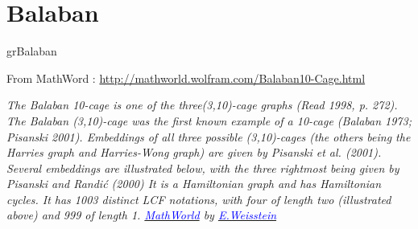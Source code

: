 \newpage\section{Balaban}\label{balaban}

\begin{NewMacroBox}{grBalaban}{}

\medskip
From MathWord : \url{http://mathworld.wolfram.com/Balaban10-Cage.html} 

\emph{The Balaban 10-cage is one of the three(3,10)-cage graphs (Read 1998, p. 272). The Balaban (3,10)-cage was the first known example of a 10-cage (Balaban 1973; Pisanski 2001). Embeddings of all three possible (3,10)-cages (the others being the Harries graph and Harries-Wong graph) are given by Pisanski et al. (2001). Several embeddings are illustrated below, with the three rightmost being given by Pisanski and Randić (2000)
It is a Hamiltonian graph and has  Hamiltonian cycles. It has 1003 distinct LCF notations, with four of length two (illustrated above) and 999 of length 1.
\href{http://mathworld.wolfram.com/topics/GraphTheory.html}%
           {\textcolor{blue}{MathWorld}} by \href{http://en.wikipedia.org/wiki/Eric_W._Weisstein}%
           {\textcolor{blue}{E.Weisstein}}
}
\end{NewMacroBox}

\subsection{}
\begin{center}
\begin{tkzexample}[vbox]
\end{tkzexample}
\end{center}


\vfill\newpage

\subsection{}
\begin{center}
\begin{tkzexample}[vbox]
\end{tkzexample}
\end{center}

